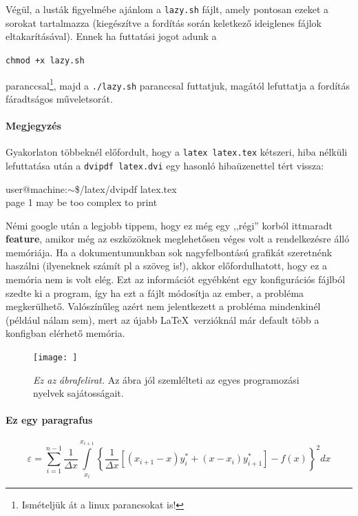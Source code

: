 \documentclass[a4paper, 12pt]{article}
\numberwithin{equation}{section}          %
\numberwithin{figure}{subsection}
\begin{document}
Végül, a lusták figyelmébe ajánlom a \texttt{lazy.sh} fájlt, amely pontosan ezeket a sorokat tartalmazza 
(kiegészítve a fordítás során keletkező ideiglenes fájlok eltakarításával). Ennek ha futtatási jogot adunk a 

\texttt{chmod +x lazy.sh}

paranccsal\footnote{Ismételjük át a linux parancsokat is!}, majd a \texttt{./lazy.sh} paranccsal futtatjuk, 
magától lefuttatja a fordítás fáradtságos műveletsorát.

\paragraph{Megjegyzés}
Gyakorlaton többeknél előfordult, hogy a \texttt{latex latex.tex} kétszeri, hiba nélküli lefuttatása után a 
\texttt{dvipdf latex.dvi} egy hasonló hibaüzenettel tért vissza: 

\noindent %
user@machine:$\sim$\$/latex/dvipdf latex.tex \\ %
page 1 may be too complex to print

Némi google után a legjobb tippem, hogy ez még egy ,,régi'' korból ittmaradt \textbf{feature}, amikor még az 
eszközöknek meglehetősen véges volt a rendelkezésre álló memóriája. Ha a dokumentumunkban sok nagyfelbontású 
grafikát szeretnénk haszálni (ilyeneknek számít pl a szöveg is!), akkor előfordulhatott, hogy ez a memória 
nem is volt elég. Ezt az információt egyébként egy konfigurációs fájlból szedte ki a program, így ha ezt a fájlt 
módosítja az ember, a probléma megkerülhető. Valószínűleg azért nem jelentkezett a probléma mindenkinél 
(például nálam sem), mert az újabb \LaTeX\ verzióknál már default több a konfigban elérhető memória.

\begin{figure}[h!]
\begin{center}
\texttt{[image: ]}
\end{center}
  \caption{\textit{Ez az ábrafelirat.} Az ábra jól szemlélteti az egyes programozási 
  nyelvek sajátosságait.}
\label{fig:abra}
\end{figure}

\paragraph{Ez egy paragrafus}
\lipsum[2-4]
\begin{equation}
  \varepsilon=\sum_{i=1}^{n-1} \frac{1}{\Delta x}\int\limits_{x_i}^{x_{i+1}}\left\{\frac{1}{\Delta x}
  \left[(x_{i+1}-x)y_i^*+(x-x_i)y_{i+1}^*\right]-f(x)\right\}^2dx
\end{equation}
\end{document}
